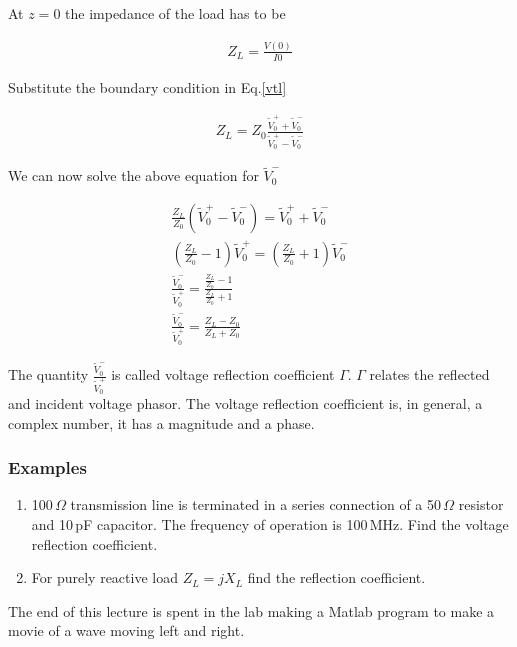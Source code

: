 \documentclass{ximera}
\begin{document}
At $z=0$ the impedance of the load has to be

\begin{eqnarray}
Z_L=\frac{V(0)}{I{0}} \nonumber 
\end{eqnarray}

Substitute the boundary condition in Eq.\ref{vtl}

\begin{eqnarray}
Z_L=Z_0 \frac{\tilde{V}_0^+ + \tilde{V}_0^-}{\tilde{V}_0^+ - \tilde{V}_0^-}
\end{eqnarray}


We can now solve the above equation for $\tilde{V}_0^-$

\begin{eqnarray}
\frac{Z_L}{Z_0} (\tilde{V}_0^+ - \tilde{V}_0^-) = \tilde{V}_0^+ + \tilde{V}_0^- \nonumber \\
(\frac{Z_L}{Z_0}-1)\tilde{V}_0^+ =(\frac{Z_L}{Z_0}+1) \tilde{V}_0^- \nonumber \\
\frac{\tilde{V}_0^-}{\tilde{V}_0^+} = \frac{\frac{Z_L}{Z_0}-1  }{ \frac{Z_L}{Z_0}+1 }
\nonumber \\
\frac{\tilde{V}_0^-}{\tilde{V}_0^+} = \frac{Z_L -Z_0}{Z_L +Z_0}
\end{eqnarray}

The quantity $\frac{\tilde{V}_0^-}{\tilde{V}_0^+}$ is called voltage reflection
coefficient $\Gamma$. $\Gamma$ relates the reflected and incident voltage
phasor. The voltage reflection coefficient is, in general, a complex number,
it has a magnitude and a phase.



\subsubsection{Examples}


 \begin{enumerate}
\item 100\,$\Omega$ transmission line is terminated in a series
connection of a 50\,$\Omega$ resistor and 10\,pF capacitor. The frequency
of operation is 100\,MHz. Find the voltage reflection coefficient.
\item For purely reactive load $Z_L=j X_L$ find the reflection
coefficient.
\end{enumerate}

The end of this lecture is spent in the lab making a Matlab program to
make a movie of a wave moving left and right.
\end{document}
